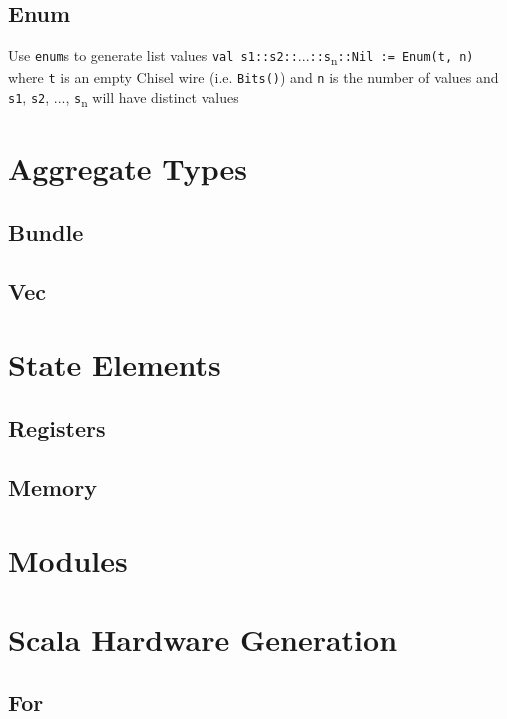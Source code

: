 \documentclass[10pt,landscape]{article}
\begin{document}
\begin{multicols}{3}
\subsection{Enum}
Use \verb$enum$s to generate list values \newline
\verb$val s1::s2::$...\verb$::s$\textsubscript{n}\verb$::Nil := Enum(t, n)$ \newline
where \verb$t$ is an empty Chisel wire (i.e. \verb$Bits()$) \newline
and \verb$n$ is the number of values \newline
and \verb$s1$, \verb$s2$, ..., \verb$s$\textsubscript{n} will have distinct values

\section{Aggregate Types}
\subsection{Bundle}

\subsection{Vec}

\section{State Elements}
\subsection{Registers}

\subsection{Memory}

\section{Modules}

\section{Scala Hardware Generation}
\subsection{For}


\end{multicols}
\end{document}
